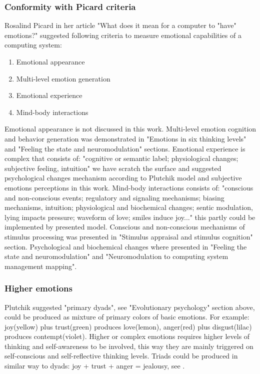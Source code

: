 \subsubsection{Conformity with Picard criteria}

Rosalind Picard in her article "What does it mean for a computer to "have" emotions?"\cite{whatdoesitmeanforcomputer} suggested following criteria to measure emotional capabilities of a computing system:

\begin{enumerate}
\item  Emotional appearance
\item  Multi-level emotion generation
\item  Emotional experience
\item  Mind-body interactions
\end{enumerate}

Emotional appearance is not discussed in this work. Multi-level emotion cognition and behavior generation was demonstrated in "Emotions in six thinking levels" and "Feeling the state and neuromodulation" sections. Emotional experience is complex that consists of: "cognitive or semantic label; physiological changes; subjective feeling, intuition" we have scratch the surface and suggested psychological changes mechanism according to Plutchik model and subjective emotions perceptions in this work. Mind-body interactions consists of: "conscious and non-conscious events; regulatory and signaling mechanisms; biasing mechanisms, intuition; physiological and biochemical changes; sentic modulation, lying impacts pressure; waveform of love; smiles induce joy..." this partly could be implemented by presented model. Conscious and non-conscious mechanisms of stimulus processing was presented in "Stimulus appraisal and stimulus cognition" section. Psychological and biochemical changes where presented in "Feeling the state and neuromodulation" and "Neuromodulation to computing system management mapping".

\subsubsection{Higher emotions}

Plutchik\cite{natureofemotions} suggested "primary dyads", see "Evolutionary psychology" section above, could be produced as mixture of primary colors of basic emotions. For example: joy(yellow) plus trust(green) produces love(lemon), anger(red) plus disgust(lilac) produces contempt(violet). Higher or complex emotions requires higher levels of thinking and self-awareness to be involved, this way they are mainly triggered on self-conscious and self-reflective thinking levels. Triads could be produced in similar way to dyads: joy + trust + anger = jealousy, see \cite{senticcomputing}.

